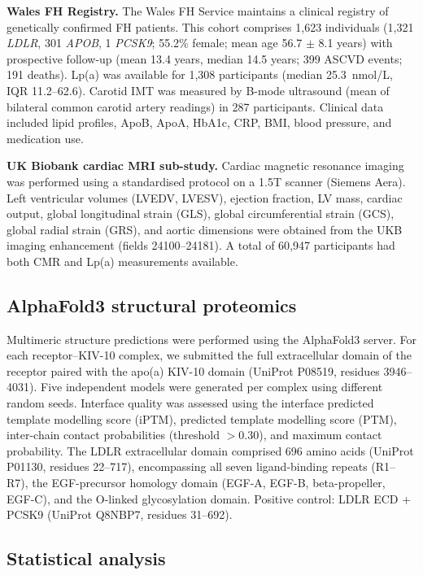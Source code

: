 \documentclass[11pt,a4paper]{article}
\newcommand{\lpa}{Lp(a)}
\newcommand{\iptm}{iPTM}
\newcommand{\kiv}{KIV-10}
\begin{document}
\textbf{Wales FH Registry.} The Wales FH Service maintains a clinical registry of genetically confirmed FH patients. This cohort comprises 1{,}623 individuals (1{,}321 \textit{LDLR}, 301 \textit{APOB}, 1 \textit{PCSK9}; 55.2\% female; mean age 56.7 $\pm$ 8.1 years) with prospective follow-up (mean 13.4 years, median 14.5 years; 399 ASCVD events; 191 deaths). \lpa{} was available for 1{,}308 participants (median 25.3~nmol/L, IQR 11.2--62.6). Carotid IMT was measured by B-mode ultrasound (mean of bilateral common carotid artery readings) in 287 participants. Clinical data included lipid profiles, ApoB, ApoA, HbA1c, CRP, BMI, blood pressure, and medication use.

\textbf{UK Biobank cardiac MRI sub-study.} Cardiac magnetic resonance imaging was performed using a standardised protocol on a 1.5T scanner (Siemens Aera). Left ventricular volumes (LVEDV, LVESV), ejection fraction, LV mass, cardiac output, global longitudinal strain (GLS), global circumferential strain (GCS), global radial strain (GRS), and aortic dimensions were obtained from the UKB imaging enhancement (fields 24100--24181). A total of 60{,}947 participants had both CMR and \lpa{} measurements available.

\subsection*{AlphaFold3 structural proteomics}

Multimeric structure predictions were performed using the AlphaFold3 server\cite{abramson2024}. For each receptor--\kiv{} complex, we submitted the full extracellular domain of the receptor paired with the apo(a) KIV-10 domain (UniProt P08519, residues 3946--4031). Five independent models were generated per complex using different random seeds. Interface quality was assessed using the interface predicted template modelling score (\iptm{}), predicted template modelling score (PTM), inter-chain contact probabilities (threshold $>$0.30), and maximum contact probability. The LDLR extracellular domain comprised 696 amino acids (UniProt P01130, residues 22--717), encompassing all seven ligand-binding repeats (R1--R7), the EGF-precursor homology domain (EGF-A, EGF-B, beta-propeller, EGF-C), and the O-linked glycosylation domain. Positive control: LDLR ECD + PCSK9 (UniProt Q8NBP7, residues 31--692).

\subsection*{Statistical analysis}
\end{document}
